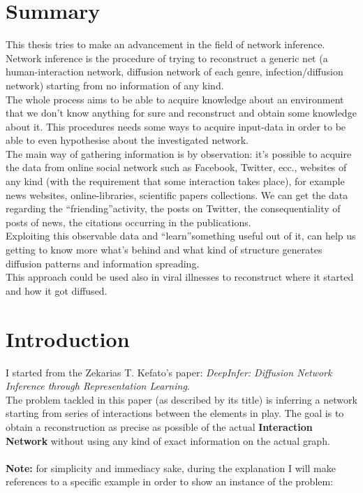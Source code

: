\documentclass{article}
\begin{document}
	\section{Summary}
	\vspace{3cm}
	This thesis tries to make an advancement in the field of network inference. Network inference is the procedure of trying to reconstruct a generic net (a human-interaction network, diffusion network of each genre, infection/diffusion network) starting from no information of any kind.\\
	The whole process aims to be able to acquire knowledge about an environment that we don't know anything for sure and reconstruct and obtain some knowledge about it. This procedures needs some ways to acquire input-data in order to be able to even hypothesise about the investigated network.\\
	The main way of gathering information is by observation: it's possible to acquire the data from online social network such as Facebook, Twitter, ecc., websites of any kind (with the requirement that some interaction takes place), for example news websites, online-libraries, scientific papers collections. We can get the data regarding the \textquotedblleft friending\textquotedblright activity, the posts on Twitter, the consequentiality of posts of news, the citations occurring in the publications.\\
	Exploiting this observable data and \textquotedblleft learn\textquotedblright something useful out of it, can help us getting to know more what's behind and what kind of structure generates diffusion patterns and information spreading.\\
	This approach could be used also in viral illnesses to reconstruct where it started and how it got diffused.
	\newpage
	\section{Introduction} 
		I started from the Zekarias	T. Kefato's paper: \textit{DeepInfer: Diffusion Network Inference through Representation Learning}.\\
		The problem tackled in this paper (as described by its title) is inferring a network starting from series of interactions between the elements in play.
		The goal is to obtain a reconstruction as precise as possible of the actual \textbf{Interaction Network} without using any kind of exact information on the actual graph.\\ 
		\\
		\textbf{Note:} for simplicity and immediacy sake, during the explanation I will make references to a specific example in order to show an instance of the problem:\\
		
\end{document}
